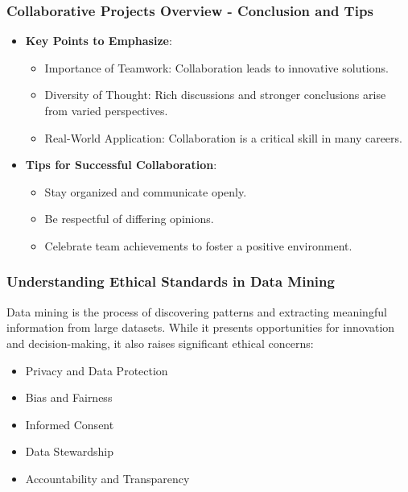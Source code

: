 \documentclass[aspectratio=169]{beamer}
\begin{document}
\begin{frame}[fragile]
    \frametitle{Collaborative Projects Overview - Conclusion and Tips}
    \begin{itemize}
        \item \textbf{Key Points to Emphasize}:
        \begin{itemize}
            \item Importance of Teamwork: Collaboration leads to innovative solutions.
            \item Diversity of Thought: Rich discussions and stronger conclusions arise from varied perspectives.
            \item Real-World Application: Collaboration is a critical skill in many careers.
        \end{itemize}
        
        \item \textbf{Tips for Successful Collaboration}:
        \begin{itemize}
            \item Stay organized and communicate openly.
            \item Be respectful of differing opinions.
            \item Celebrate team achievements to foster a positive environment.
        \end{itemize}
    \end{itemize}
\end{frame}

\begin{frame}[fragile]
    \titlepage
\end{frame}

\begin{frame}[fragile]
    \frametitle{Understanding Ethical Standards in Data Mining}
    Data mining is the process of discovering patterns and extracting meaningful information from large datasets. While it presents opportunities for innovation and decision-making, it also raises significant ethical concerns:
    \begin{itemize}
        \item Privacy and Data Protection
        \item Bias and Fairness
        \item Informed Consent
        \item Data Stewardship
        \item Accountability and Transparency
    \end{itemize}
\end{frame}
\end{document}
